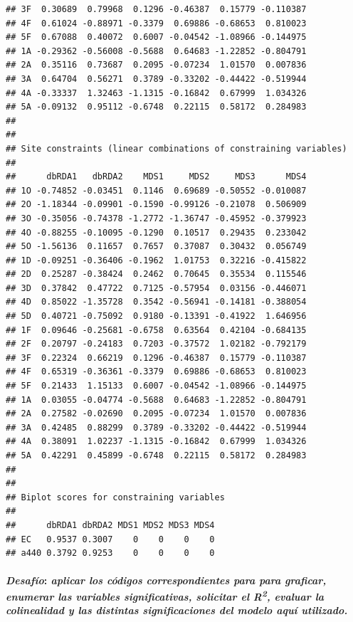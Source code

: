 \documentclass[
]{book}
\begin{document}
\begin{verbatim}
## 3F  0.30689  0.79968  0.1296 -0.46387  0.15779 -0.110387
## 4F  0.61024 -0.88971 -0.3379  0.69886 -0.68653  0.810023
## 5F  0.67088  0.40072  0.6007 -0.04542 -1.08966 -0.144975
## 1A -0.29362 -0.56008 -0.5688  0.64683 -1.22852 -0.804791
## 2A  0.35116  0.73687  0.2095 -0.07234  1.01570  0.007836
## 3A  0.64704  0.56271  0.3789 -0.33202 -0.44422 -0.519944
## 4A -0.33337  1.32463 -1.1315 -0.16842  0.67999  1.034326
## 5A -0.09132  0.95112 -0.6748  0.22115  0.58172  0.284983
## 
## 
## Site constraints (linear combinations of constraining variables)
## 
##      dbRDA1   dbRDA2    MDS1     MDS2     MDS3      MDS4
## 1O -0.74852 -0.03451  0.1146  0.69689 -0.50552 -0.010087
## 2O -1.18344 -0.09901 -0.1590 -0.99126 -0.21078  0.506909
## 3O -0.35056 -0.74378 -1.2772 -1.36747 -0.45952 -0.379923
## 4O -0.88255 -0.10095 -0.1290  0.10517  0.29435  0.233042
## 5O -1.56136  0.11657  0.7657  0.37087  0.30432  0.056749
## 1D -0.09251 -0.36406 -0.1962  1.01753  0.32216 -0.415822
## 2D  0.25287 -0.38424  0.2462  0.70645  0.35534  0.115546
## 3D  0.37842  0.47722  0.7125 -0.57954  0.03156 -0.446071
## 4D  0.85022 -1.35728  0.3542 -0.56941 -0.14181 -0.388054
## 5D  0.40721 -0.75092  0.9180 -0.13391 -0.41922  1.646956
## 1F  0.09646 -0.25681 -0.6758  0.63564  0.42104 -0.684135
## 2F  0.20797 -0.24183  0.7203 -0.37572  1.02182 -0.792179
## 3F  0.22324  0.66219  0.1296 -0.46387  0.15779 -0.110387
## 4F  0.65319 -0.36361 -0.3379  0.69886 -0.68653  0.810023
## 5F  0.21433  1.15133  0.6007 -0.04542 -1.08966 -0.144975
## 1A  0.03055 -0.04774 -0.5688  0.64683 -1.22852 -0.804791
## 2A  0.27582 -0.02690  0.2095 -0.07234  1.01570  0.007836
## 3A  0.42485  0.88299  0.3789 -0.33202 -0.44422 -0.519944
## 4A  0.38091  1.02237 -1.1315 -0.16842  0.67999  1.034326
## 5A  0.42291  0.45899 -0.6748  0.22115  0.58172  0.284983
## 
## 
## Biplot scores for constraining variables
## 
##      dbRDA1 dbRDA2 MDS1 MDS2 MDS3 MDS4
## EC   0.9537 0.3007    0    0    0    0
## a440 0.3792 0.9253    0    0    0    0
\end{verbatim}

\hypertarget{desafuxedo-aplicar-los-cuxf3digos-correspondientes-para-para-graficar-enumerar-las-variables-significativas-solicitar-el-r2-evaluar-la-colinealidad-y-las-distintas-significaciones-del-modelo-aquuxed-utilizado.}{%
\paragraph{\texorpdfstring{\textbf{\emph{Desafío}}: \emph{aplicar los códigos correspondientes para para graficar, enumerar las variables significativas, solicitar el R\textsuperscript{2}, evaluar la colinealidad y las distintas significaciones del modelo aquí utilizado.}}{Desafío: aplicar los códigos correspondientes para para graficar, enumerar las variables significativas, solicitar el R2, evaluar la colinealidad y las distintas significaciones del modelo aquí utilizado.}}\label{desafuxedo-aplicar-los-cuxf3digos-correspondientes-para-para-graficar-enumerar-las-variables-significativas-solicitar-el-r2-evaluar-la-colinealidad-y-las-distintas-significaciones-del-modelo-aquuxed-utilizado.}}
\end{document}
